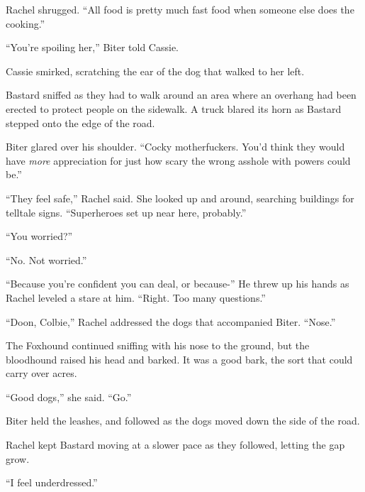 Rachel shrugged.  ``All food is pretty much fast food when someone else does the cooking.''



``You're spoiling her,'' Biter told Cassie.



Cassie smirked, scratching the ear of the dog that walked to her left.



Bastard sniffed as they had to walk around an area where an overhang had been erected to protect people on the sidewalk.  A truck blared its horn as Bastard stepped onto the edge of the road.



Biter glared over his shoulder.  ``Cocky motherfuckers.  You'd think they would have \emph{more} appreciation for just how scary the wrong asshole with powers could be.''



``They feel safe,'' Rachel said.  She looked up and around, searching buildings for telltale signs.  ``Superheroes set up near here, probably.''



``You worried?''



``No.  Not worried.''



``Because you're confident you can deal, or because-''  He threw up his hands as Rachel leveled a stare at him.  ``Right.  Too many questions.''



``Doon, Colbie,'' Rachel addressed the dogs that accompanied Biter.  ``Nose.''



The Foxhound continued sniffing with his nose to the ground, but the bloodhound raised his head and barked.  It was a good bark, the sort that could carry over acres.



``Good dogs,'' she said.  ``Go.''



Biter held the leashes, and followed as the dogs moved down the side of the road.



Rachel kept Bastard moving at a slower pace as they followed, letting the gap grow.



``I feel underdressed.''



